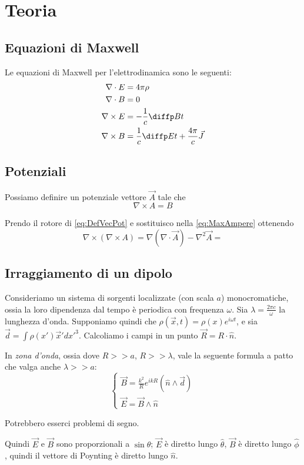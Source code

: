 \documentclass[a4paper,10pt,oneside]{math_article}
\newcommand{\rot}{\nabla \times}
\renewcommand{\div}{\nabla \cdot}
\newcommand{\grad}{\nabla}
\newcommand{\lapl}{\nabla^2}
\begin{document}
	\section{Teoria}
		\subsection{Equazioni di Maxwell}
			Le equazioni di Maxwell per l'elettrodinamica sono le seguenti:
			\begin{align}\displaystyle
				\div E &= 4\pi \rho \label{eq:MaxGauss}\\ 
				\div B &= 0 \label{eq:MaxMonopole} \\
				\rot E &= -\frac1c \diffp Bt \label{eq:MaxFaraday}\\
				\rot B &= \dfrac1c \diffp Et + \dfrac{4\pi}c \vec J \label{eq:MaxAmpere}
			\end{align}
			
		\subsection{Potenziali}
			Possiamo definire un potenziale vettore $\vec A$ tale che
			\begin{equation}\label{eq:DefVecPot}
			 \rot A = B
			\end{equation}

			Prendo il rotore di \ref{eq:DefVecPot} e sostituisco nella \ref{eq:MaxAmpere} ottenendo
			\begin{equation}
				\rot (\rot A) = \grad(\div \vec A) - \lapl \vec A = 
			\end{equation}
			
		\subsection{Irraggiamento di un dipolo}
			Consideriamo un sistema di sorgenti localizzate (con scala $a$) monocromatiche, ossia la loro dipendenza dal tempo è periodica con frequenza $\omega$. Sia $\lambda=\frac{2\pi c}{\omega}$ la lunghezza d'onda.
			Supponiamo quindi che $\rho(\vec x, t) = \rho(x)e^{i\omega t}$, e sia $\vec d= \int \rho(x')\vec x' dx'^3$. Calcoliamo i campi in un punto $\vec R = R\cdot \hat n$.
			
			In \emph{zona d'onda}, ossia dove $R >> a$, $R >> \lambda$, vale la seguente formula a patto che valga anche $\lambda >> a$:
			\begin{equation}
				\begin{cases}
					\vec B = \frac{k^2}{R} e^{ikR} (\hat n \wedge \vec d)\\
					\vec E = \vec B \wedge \hat n
				\end{cases}
			\end{equation}
			
			Potrebbero esserci problemi di segno.

			Quindi $\vec E$ e $\vec B$ sono proporzionali a $\sin \theta$; $\vec E$ è diretto lungo $\hat \theta$, $\vec B$ è diretto lungo $\hat \phi$, quindi il vettore di Poynting è diretto lungo $\hat n$.
			
			
		
\end{document}
